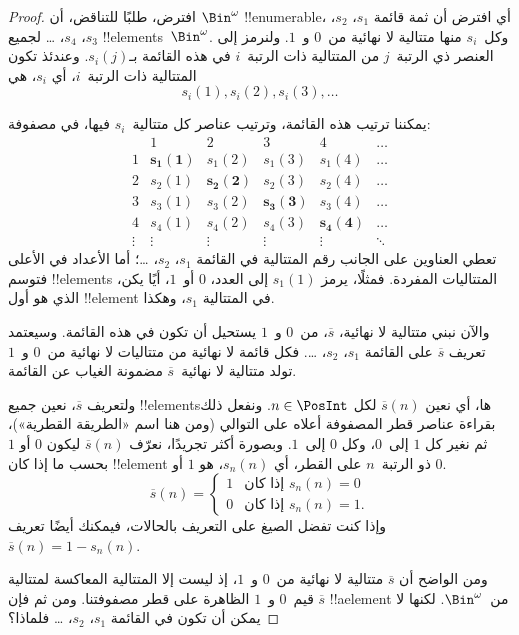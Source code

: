 \documentclass[../../../include/open-logic-section]{subfiles}
\begin{document}
\begin{proof}
افترض، طلبًا للتناقض، أن $\Bin^\omega$ !!{enumerable}، أي افترض أن
ثمة قائمة $s_{1}$، $s_{2}$، $s_{3}$، $s_{4}$، \dots{} لجميع
!!{element}s~$\Bin^\omega$. وكل~$s_i$ منها متتالية لا نهائية
من~$0$ و~$1$. ولنرمز إلى العنصر ذي الرتبة~$j$ من المتتالية ذات
الرتبة~$i$ في هذه القائمة بـ$s_i(j)$. وعندئذ تكون المتتالية ذات الرتبة~$i$، أي
$s_i$، هي
\[
s_i(1), s_i(2), s_i(3), \dots
\]

يمكننا ترتيب هذه القائمة، وترتيب عناصر كل متتالية~$s_i$ فيها،
في مصفوفة:
\[
\begin{array}{c|c|c|c|c|c}
& 1 & 2 & 3 & 4 & \dots \\\hline
1 & \mathbf{s_{1}(1)} & s_{1}(2) & s_{1}(3) & s_1(4) & \dots \\\hline
2 & s_{2}(1)& \mathbf{s_{2}(2)} & s_2(3) & s_2(4) & \dots \\\hline
3 & s_{3}(1)& s_{3}(2) & \mathbf{s_3(3)} & s_3(4) & \dots \\\hline
4 & s_{4}(1)& s_{4}(2) & s_4(3) & \mathbf{s_4(4)} & \dots \\\hline
\vdots & \vdots & \vdots & \vdots & \vdots & \mathbf{\ddots}
\end{array}
\]
تعطي العناوين على الجانب رقم المتتالية في القائمة $s_1$، $s_2$،
\dots؛ أما الأعداد في الأعلى فتوسم !!{element}s المتتاليات المفردة.
فمثلًا، يرمز $s_{1}(1)$ إلى العدد، $0$ أو~$1$، أيًا يكن، الذي هو أول
!!{element} في المتتالية $s_{1}$، وهكذا.

والآن نبني متتالية لا نهائية، $\overline{s}$، من~$0$ و~$1$ يستحيل
أن تكون في هذه القائمة. وسيعتمد تعريف $\overline{s}$ على القائمة
$s_1$، $s_2$، \dots. فكل قائمة لا نهائية من متتاليات لا نهائية
من~$0$ و~$1$ تولد متتالية لا نهائية~$\overline{s}$ مضمونة الغياب عن
القائمة.

ولتعريف $\overline{s}$، نعين جميع !!{element}sها، أي نعين
$\overline{s}(n)$ لكل $n \in \PosInt$. ونفعل ذلك بقراءة عناصر قطر المصفوفة
أعلاه على التوالي (ومن هنا اسم «الطريقة القطرية»)، ثم نغير كل
$1$ إلى~$0$، وكل $0$ إلى~$1$. وبصورة أكثر تجريدًا، نعرّف
$\overline{s}(n)$ ليكون $0$ أو $1$ بحسب ما إذا كان !!{element} ذو
الرتبة~$n$ على القطر، أي $s_n(n)$، هو $1$ أو $0$.
\[
\overline{s}(n) =
\begin{cases}
1 & \text{إذا كان $s_{n}(n) = 0$}\\
0 & \text{إذا كان $s_{n}(n) = 1$}.
\end{cases}
\]
وإذا كنت تفضل الصيغ على التعريف بالحالات، فيمكنك أيضًا تعريف
$\overline{s}(n) = 1 - s_n(n)$.

ومن الواضح أن $\overline{s}$ متتالية لا نهائية من~$0$ و~$1$، إذ ليست
إلا المتتالية المعاكسة لمتتالية قيم~$0$ و~$1$ الظاهرة على قطر
مصفوفتنا. ومن ثم فإن $\overline{s}$ !!a{element} من~$\Bin^\omega$.
لكنها لا يمكن أن تكون في القائمة $s_1$، $s_2$، \dots{} فلماذا؟


\end{proof}
\end{document}

